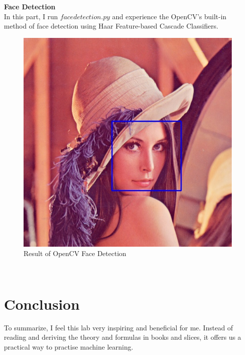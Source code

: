\documentclass[journal, a4paper]{IEEEtran}
\begin{document}
\centering \textbf{Face Detection}\\
In this part, I run $face detection.py$ and experience the OpenCV's built-in method of face detection using Haar Feature-based Cascade Classifiers.
\begin{figure}[!hbt]
	\begin{center}
	\includegraphics[width=\columnwidth]{result.jpg}
	\caption{Result of OpenCV Face Detection}
	\label{fig2}
	\end{center}
\end{figure}\\
\par




\section{Conclusion}
	To summarize, I feel this lab very inspiring and beneficial for me. Instead of reading and deriving the theory and formulas in books and slices, it offers us a practical way to practise machine learning.



\end{document}
